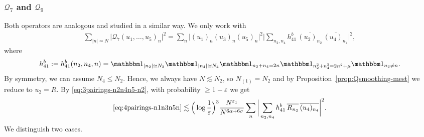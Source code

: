 \documentclass[11pt, xcolor = dvipsnames,reqno
]{amsart}
\theoremstyle{definition}
\theoremstyle{remark}
\begin{document}
    \subsubsection{$\mathcal Q_7$ and $\mathcal Q_9$} 
    Both operators are analogous and studied in a similar way. 
    We only work with 
    \begin{align}\label{eq:4pairings-n1n3n5n}
        \sum_{|n| \simeq N}  \big| \mathcal{Q}_7(u_1, \ldots, u_5)_n \big|^2
        =
        \sum_n \big|(u_1)_n(u_3)_n(u_5)_n \big|^2 \Bigg| \sum_{ n_2, n_4} h^b_{41} \,  \overline{(u_2)_{n_2}} \, \overline{(u_4)_{n_4}} \Bigg|^2,
    \end{align}
    where
    \begin{align*}
        h^b_{41} := h^b_{41}(n_2,n_4,n) 
        = \mathbbm 1_{|n_2| \simeq N_2}
        \mathbbm 1_{|n_4| \simeq N_4}
        \mathbbm 1_{n_2 + n_4 = 2n}
        \mathbbm 1_{n_2^2 + n_4^2 = 2n^2 + \mu}
        \mathbbm 1_{n_2 \neq n}.
    \end{align*}
    By symmetry, we can assume $N_4 \leq N_2$.  Hence, we always have $N \lesssim N_2$, so $N_{(1)} = N_2$ and by Proposition~\ref{prop:Qsmoothing-mest} we reduce to $u_2 = R$. By \eqref{eq:3pairings-n2n4n5-n2}, with probability $\geq 1 - \varepsilon$ we get
    \begin{align}\label{eq:eq:4pairings-n1n3n5n_2}
        \eqref{eq:4pairings-n1n3n5n}
        \lesssim 
        \Big( \log \frac{1}{\varepsilon} \Big)^3 \frac{N^{\varepsilon_1}}{N^{6\alpha + 6\sigma}}
        \sum_n \bigg| \sum_{ n_2, n_4} h^b_{41} \,  \overline{R_{n_2}} \, \overline{(u_4)_{n_4}} \bigg|^2.
    \end{align}
    We distinguish two cases.
\end{document}
